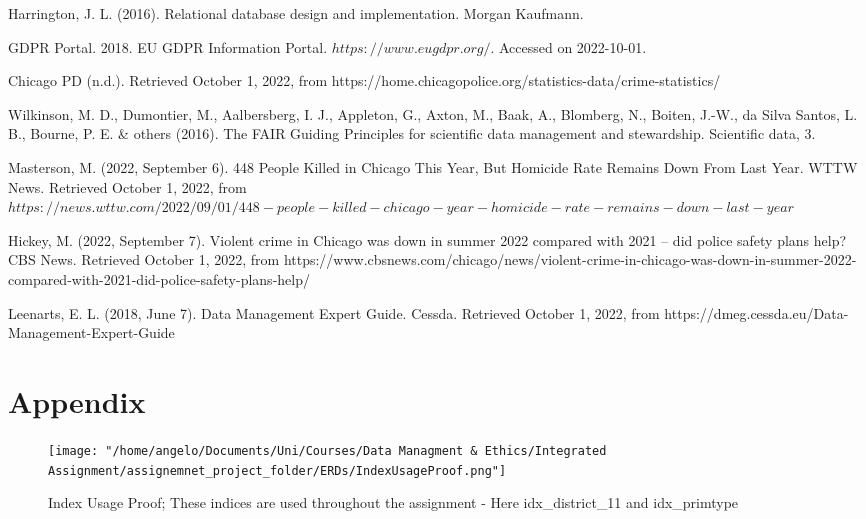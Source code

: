 \documentclass[a4paper]{article}
\begin{document}
\begin{thebibliography}{100} %
 Harrington, J. L. (2016). Relational database design and implementation. Morgan Kaufmann.

 GDPR Portal. 2018. EU GDPR Information Portal. $https://www.eugdpr.org/$. Accessed on 2022-10-01.

 Chicago PD (n.d.). Retrieved October 1, 2022, from https://home.chicagopolice.org/statistics-data/crime-statistics/

 Wilkinson, M. D., Dumontier, M., Aalbersberg, I. J., Appleton, G., Axton, M., Baak, A., Blomberg, N., Boiten, J.-W., da Silva Santos, L. B., Bourne, P. E. \& others (2016). The FAIR Guiding Principles for scientific data management and stewardship. Scientific data, 3.

 Masterson, M. (2022, September 6). 448 People Killed in Chicago This Year, But Homicide Rate Remains Down From Last Year. WTTW News. Retrieved October 1, 2022, from $https://news.wttw.com/2022/09/01/448-people-killed-chicago-year-homicide-rate-remains-down-last-year$

 Hickey, M. (2022, September 7). Violent crime in Chicago was down in summer 2022 compared with 2021 -- did police safety plans help? CBS News. Retrieved October 1, 2022, from https://www.cbsnews.com/chicago/news/violent-crime-in-chicago-was-down-in-summer-2022-compared-with-2021-did-police-safety-plans-help/

 Leenarts, E. L. (2018, June 7). Data Management Expert Guide. Cessda. Retrieved October 1, 2022, from https://dmeg.cessda.eu/Data-Management-Expert-Guide

\end{thebibliography}



\section{Appendix}
\begin{figure}[htp]
		\centering
			\texttt{[image: "/home/angelo/Documents/Uni/Courses/Data Managment \& Ethics/Integrated Assignment/assignemnet\_project\_folder/ERDs/IndexUsageProof.png"]}
         \small
         \caption{Index Usage Proof; These indices are used throughout the assignment - Here idx\_district\_11 and idx\_primtype}
\end{figure}
\end{document}
